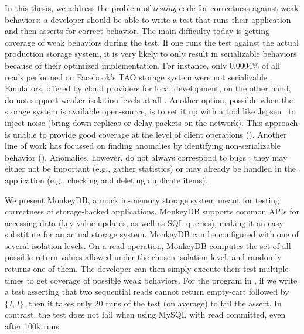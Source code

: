 In this thesis, we address the problem of \textit{testing} code for correctness
against weak behaviors: a developer should be able to write a test that runs
their application and then asserts for correct behavior. 
The main difficulty today is getting coverage of weak behaviors during
the test. If one runs the test
against the actual production storage system, it is very likely to only result in
serializable behaviors because of their optimized implementation. For
instance, only 0.0004\% of all reads performed on Facebook's TAO storage system 
were not serializable \cite{DBLP:conf/sosp/LuVAHSTKL15}. 
Emulators, offered by cloud providers for local development, on the other hand, do not support weaker
isolation levels at all \cite{cosmosdb-local}. Another option, possible when
the storage system is available open-source, is to set it up with a 
tool like Jepsen~\cite{jepsen} to inject noise (bring down replicas or
delay packets on the network). 
This approach is unable to provide good coverage at the level of client operations
\cite{DBLP:journals/pacmpl/RahmaniNDJ19} (). Another line of work has focussed on finding
anomalies by identifying non-serializable behavior (). Anomalies, however, do not
always correspond to bugs \cite{DBLP:conf/pldi/BrutschyD0V18,DBLP:journals/pvldb/GanRRB020}; they may
either not be important (e.g., gather statistics) or may already be handled in
the application (e.g., checking and deleting duplicate items).

We present MonkeyDB, a mock in-memory storage system meant for testing
correctness of storage-backed applications. 
MonkeyDB supports 
common APIs for accessing data (key-value updates, as well as SQL queries),
making it an easy substitute for an actual storage system. MonkeyDB
can be configured with one of several isolation levels. 
On a read operation, MonkeyDB computes the set of all possible return values
allowed under the chosen isolation level, and randomly returns one of them. The
developer can then simply execute their test multiple times to get coverage of
possible weak behaviors. For the program in , if we write a test
asserting that two sequential reads cannot return empty-cart followed by $\{I,
I\}$, then it takes only 20 runs of the test (on average) to fail the
assert. In contrast, the test does not fail when using MySQL with read committed, 
even after 100k runs. 


